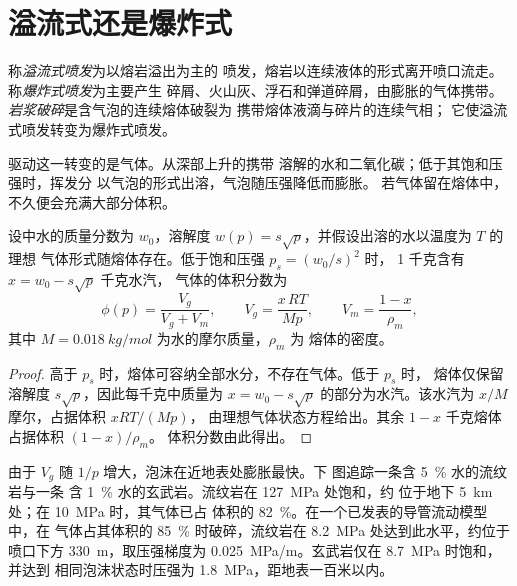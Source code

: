 \section{溢流式还是爆炸式}

\begin{definition}\label{def:b2:eruptive-styles:regimes}
称\emph{溢流式喷发}为以熔岩溢出为主的
喷发，熔岩以连续液体的形式离开喷口流走。
称\emph{爆炸式喷发}为主要产生
碎屑、火山灰、浮石和弹道碎屑，由膨胀的气体携带。
\emph{岩浆破碎}是含气泡的连续熔体破裂为
携带熔体液滴与碎片的连续气相；
它使溢流式喷发转变为爆炸式喷发。
\end{definition}

驱动这一转变的是气体。从深部上升的携带
溶解的水和二氧化碳；低于其饱和压强时，挥发分
以气泡的形式出溶，气泡随压强降低而膨胀。
若气体留在熔体中，不久便会充满大部分体积。

\begin{proposition}[封闭系统脱气中的气体体积分数]\label{prop:b2:eruptive-styles:gas}
设中水的质量分数为 $w_0$，溶解度 $w(p) =
s\sqrt p$，并假设出溶的水以温度为 $T$ 的理想
气体形式随熔体存在。低于饱和压强 $p_s = (w_0/s)^2$ 时，
1 千克含有 $x = w_0 - s\sqrt p$ 千克水汽，
气体的体积分数为
\[
\phi(p) = \frac{V_g}{V_g + V_m}, \qquad V_g = \frac{x\,RT}{M p}, \qquad
V_m = \frac{1 - x}{\rho_m},
\]
其中 $M = \qty{0.018}{kg/mol}$ 为水的摩尔质量，$\rho_m$ 为
熔体的密度。
\end{proposition}

\begin{proof}
高于 $p_s$ 时，熔体可容纳全部水分，不存在气体。低于 $p_s$ 时，
熔体仅保留溶解度 $s\sqrt p$，因此每千克中质量为 $x = w_0 - s\sqrt p$
的部分为水汽。该水汽为 $x/M$ 摩尔，占据体积 $xRT/(Mp)$，
由理想气体状态方程给出。其余 $1 - x$ 千克熔体占据体积 $(1 - x)/\rho_m$。
体积分数由此得出。
\end{proof}

由于 $V_g$ 随 $1/p$ 增大，泡沫在近地表处膨胀最快。下
图追踪一条含 \qty{5}{\percent} 水的流纹岩与一条
含 \qty{1}{\percent} 水的玄武岩。流纹岩在 \qty{127}{MPa} 处饱和，约
位于地下 \qty{5}{km} 处；在 \qty{10}{MPa} 时，其气体已占
体积的 \qty{82}{\percent}。在一个已发表的导管流动模型中，在
气体占其体积的 \qty{85}{\percent} 时破碎，流纹岩在
\qty{8.2}{MPa} 处达到此水平，约位于喷口下方 \qty{330}{m}，取压强梯度为
\qty{0.025}{MPa/m}。玄武岩仅在 \qty{8.7}{MPa} 时饱和，并达到
相同泡沫状态时压强为 \qty{1.8}{MPa}，距地表一百米以内。

